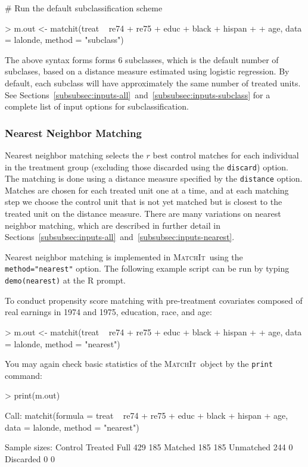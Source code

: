 \documentclass[oneside,letterpaper,titlepage]{article}
\newcommand{\MatchIt}{\textsc{MatchIt}}
\begin{document}
\# Run the default subclassification scheme
\begin{Schunk}
\begin{Sinput}
> m.out <- matchit(treat ~ re74 + re75 + educ + black + hispan + 
+     age, data = lalonde, method = "subclass")
\end{Sinput}
\end{Schunk}

The above syntax forms forms 6 subclasses, which is the default number
of subclases, based on a distance measure estimated using logistic
regression.  By default, each subclass will have approximately the
same number of treated units.  See
Sections~\ref{subsubsec:inputs-all}~and~\ref{subsubsec:inputs-subclass}
for a complete list of input options for subclassification.

\subsubsection{Nearest Neighbor Matching}
\label{subsubsec:nearest}

Nearest neighbor matching selects the $r$ best control matches for
each individual in the treatment group (excluding those discarded
using the \texttt{discard}) option.  The matching is done using a
distance measure specified by the {\tt distance} option. Matches are
chosen for each treated unit one at a time, and at each matching step
we choose the control unit that is not yet matched but is closest to
the treated unit on the distance measure.  There are many variations
on nearest neighbor matching, which are described in further detail in
Sections~\ref{subsubsec:inputs-all}~and~\ref{subsubsec:inputs-nearest}.

Nearest neighbor matching is implemented in \MatchIt\ using the
\texttt{method="nearest"} option.  The following example script can be
run by typing {\tt demo(nearest)} at the R prompt.

To conduct propensity score matching with pre-treatment covariates
composed of real earnings in 1974 and 1975, education, race, and age:

\begin{Schunk}
\begin{Sinput}
> m.out <- matchit(treat ~ re74 + re75 + educ + black + hispan + 
+     age, data = lalonde, method = "nearest")
\end{Sinput}
\end{Schunk}

\noindent You may again check basic statistics of the \MatchIt\ object by the
\texttt{print} command:
\begin{Schunk}
\begin{Sinput}
> print(m.out)
\end{Sinput}
\begin{Soutput}
Call: matchit(formula = treat ~ re74 + re75 + educ + black + hispan +     age, data = lalonde, method = "nearest")

Sample sizes:
          Control Treated
Full          429     185
Matched       185     185
Unmatched     244       0
Discarded       0       0
\end{Soutput}
\end{Schunk}
\end{document}
